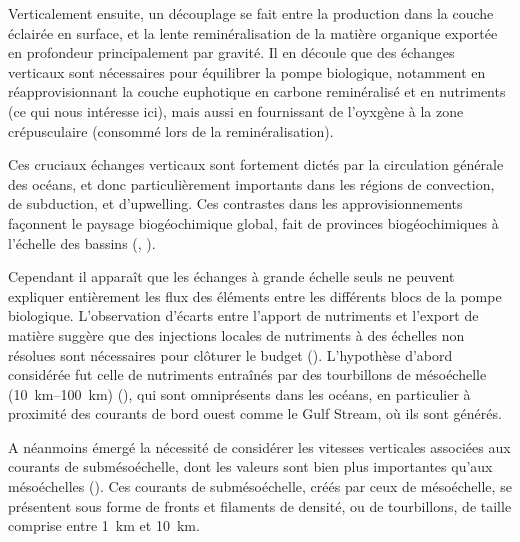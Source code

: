 Verticalement ensuite, un découplage se fait entre la production dans la couche éclairée en surface, et la lente reminéralisation de la matière organique exportée en profondeur principalement par gravité.
Il en découle que des échanges verticaux sont nécessaires pour équilibrer la pompe biologique, notamment en réapprovisionnant la couche euphotique en carbone reminéralisé et en nutriments (ce qui nous intéresse ici), mais aussi en fournissant de l'oyxgène à la zone crépusculaire (consommé lors de la reminéralisation).


Ces cruciaux échanges verticaux sont fortement dictés par la circulation générale des océans, et donc particulièrement importants dans les régions de convection, de subduction, et d'upwelling.
Ces contrastes dans les approvisionnements façonnent le paysage biogéochimique global, fait de provinces biogéochimiques à l'échelle des bassins (, \cite{williams_2011}).

\begin{figure}
  \centering
  \label{fig:nutricline-globale}
\end{figure}

Cependant il apparaît que les échanges à grande échelle seuls ne peuvent expliquer entièrement les flux des éléments entre les différents blocs de la pompe biologique.
L'observation d'écarts entre l'apport de nutriments et l'export de matière  suggère que des injections locales de nutriments à des échelles non résolues sont nécessaires pour clôturer le budget (\cite{mcgillicuddy_1998, oschlies_2002}).
L'hypothèse d'abord considérée fut celle de nutriments entraînés par des tourbillons de mésoéchelle (\qtyrange{10}{100}{\km}) (\cite{mcgillicuddy_2016}), qui sont omniprésents dans les océans, en particulier à proximité des courants de bord ouest comme le Gulf Stream, où ils sont générés.

A néanmoins émergé la nécessité de considérer les vitesses verticales associées aux courants de submésoéchelle, dont les valeurs sont bien plus importantes qu'aux mésoéchelles (\cite{klein_2009}).
Ces courants de submésoéchelle, créés par ceux de mésoéchelle, se présentent sous forme de fronts et filaments de densité, ou de tourbillons, de taille comprise entre \qty{1}{\km} et \qty{10}{\km}.


